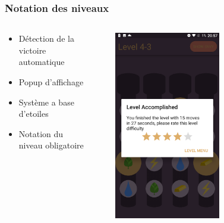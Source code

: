 \documentclass{beamer}
\begin{document}
\begin{frame}
\frametitle{Notation des niveaux}
\begin{columns}
\begin{column}{0.49\textwidth}
   \begin{itemize}
	\item Détection de la victoire automatique
    \item Popup d'affichage 
    \item Système a base d'etoiles
    \item Notation du niveau obligatoire
\end{itemize}
\end{column}~
\begin{column}{0.49\textwidth}
    \begin{center}
     \includegraphics[width=0.55\textwidth]{g4}
     \end{center}
\end{column}
\end{columns}
\end{frame}
\end{document}

